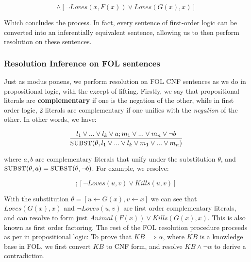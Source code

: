 \documentclass[12pt]{article}
\begin{document}
 \begin{equation*}
[Animal(F(x)) \land Loves(G(x), x)] \land [\lnot Loves(x, F(x)) \lor Loves(G(x), x)]
\end{equation*}

Which concludes the process. In fact, every sentence of first-order logic can be converted into an inferentially equivalent sentence, allowing us to then perform resolution on these sentences.

\subsubsection{Resolution Inference on FOL sentences}

Just as modus ponens, we perform resolution on FOL CNF sentences as we do in propositional logic, with the except of lifting. Firstly, we say that propositional literals are \textbf{complementary} if one is the negation of the other, while in first order logic, 2 literals are complementary if one unifies with the \textit{negation} of the other. In other words, we have:

\begin{equation*}
\frac{l_1 \lor ... \lor l_k \lor a; m_1 \lor ... \lor m_n \lor \lnot b}{\textsc{\small{SUBST}}(\theta, l_1 \lor ... \lor l_k \lor m_1 \lor ... \lor m_n)}
\end{equation*}

where $a, b$ are complementary literals that unify under the substitution $\theta$, and $\textsc{\small{SUBST}}(\theta, a) = \textsc{\small{SUBST}}(\theta, \lnot b)$. For example, we resolve:

\begin{equation*}
[Animal(F(x)) \land Loves(G(x), x)] ; [\lnot Loves(u, v) \lor Kills(u, v)]
\end{equation*}

With the substitution $\theta = [u \leftarrow G(x), v \leftarrow x]$ we can see that $Loves(G(x), x)$ and $\lnot Loves(u, v)$ are first order complementary literals, and can resolve to form just $Animal(F(x)) \lor Kills(G(x), x)$. This is also known as first order factoring. The rest of the FOL resolution procedure proceeds as per in propositional logic: To prove that $KB \implies \alpha$, where $KB$ is a knowledge base in FOL, we first convert $KB$ to CNF form, and resolve $KB \land \lnot \alpha$ to derive a contradiction.
 
\end{document}
